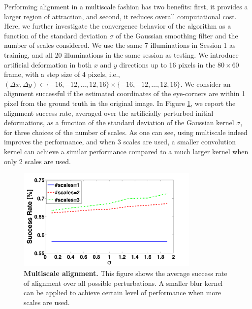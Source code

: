 \documentclass[10pt,journal,letterpaper,compsoc]{IEEEtran} %
\begin{document}
Performing alignment in a multiscale fashion has two benefits: first, it provides a larger region of attraction, and second, it reduces overall computational cost. Here, we further investigate the convergence behavior of the algorithm as a function of the standard deviation $\sigma$ of the Gaussian smoothing filter and the number of scales considered.
We use the same 7 illuminations in
Session 1 as training, and all 20 illuminations in the same
session as testing. We introduce artificial deformation in
both $x$ and $y$ directions up to 16 pixels in the
$80\times 60$ frame, with a step size of 4 pixels, i.e.,
$(\Delta x, \Delta y) \in \{-16,-12,\ldots,12,16\} \times
\{-16,-12,\ldots,12,16\}$. We consider an alignment
successful if the estimated coordinates of the eye-corners
are within 1 pixel from the ground truth in the original
image.  In Figure \ref{fig:multiscale}, we report the
alignment success rate, averaged over the artificially
perturbed initial deformations, as a function of the
standard deviation of the Gaussian kernel $\sigma$, for
three choices of the number of scales. As one can see,
using multiscale indeed improves the performance, and when
3 scales are used, a smaller convolution kernel can achieve
a similar performance compared to a much larger kernel when
only 2 scales are used.
\begin{figure}
\centering
\includegraphics[width=3.5in]{figures_pami/multiscale.png}
\vspace{0mm}
\caption{{\bf Multiscale alignment.} This figure shows the average success rate of alignment over all possible perturbations. A smaller blur kernel can be applied to achieve certain level of performance when more scales are used.}
\label{fig:multiscale}
\vspace{0mm}
\end{figure}
\end{document}
